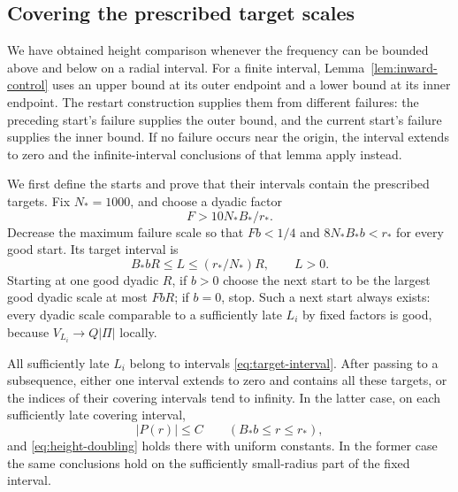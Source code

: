 \subsection{Covering the prescribed target scales}

We have obtained height comparison whenever the frequency can be
bounded above and below on a radial interval. For a finite interval,
Lemma~\ref{lem:inward-control} uses an upper bound at its outer endpoint
and a lower bound at its inner endpoint. The restart construction supplies
them from different failures: the preceding start's failure supplies the
outer bound, and the current start's failure supplies the inner bound.
If no failure occurs near the origin, the interval extends to zero and
the infinite-interval conclusions of that lemma apply instead.

We first define the starts and prove that their intervals contain the
prescribed targets. Fix $N_*=1000$, and choose a dyadic factor
\begin{equation}\label{eq:restart-factor}
 F>10N_*B_*/r_*.
\end{equation}
Decrease the maximum failure scale so that
$Fb<1/4$ and $8N_*B_*b<r_*$ for every good start.
Its target interval is
\begin{equation}\label{eq:target-interval}
 B_*bR\le L\le(r_*/N_*)R,\qquad L>0.
\end{equation}
Starting at one good dyadic $R$, if $b>0$ choose the next start to be
the largest good dyadic scale at most $FbR$; if $b=0$, stop. Such a
next start always exists: every dyadic scale comparable to a sufficiently
late $L_i$ by fixed factors is good, because $V_{L_i}\to Q|\Pi|$
locally.

\begin{proposition}\label{prop:target-frequency}
All sufficiently late $L_i$ belong to intervals
\eqref{eq:target-interval}. After passing to a subsequence, either one
interval extends to zero and contains all these targets, or the indices
of their covering intervals tend to infinity. In the latter case,
on each sufficiently late covering interval,
\begin{equation}\label{eq:uniform-frequency-range}
 |P(r)|\le C\qquad(B_*b\le r\le r_*),
\end{equation}
and \eqref{eq:height-doubling} holds there with uniform constants.
In the former case the same conclusions hold on the sufficiently
small-radius part of the fixed interval.
\end{proposition}

